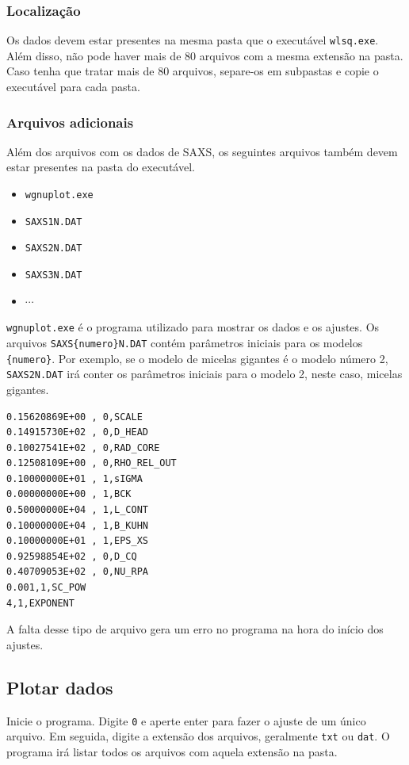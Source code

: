 \begin{apendicesenv}
\subsubsection{Localização}
Os dados devem estar presentes na mesma pasta que o executável \texttt{wlsq.exe}. Além disso, não pode haver mais de 80 arquivos com a mesma extensão na pasta. Caso tenha que tratar mais de 80 arquivos, separe-os em subpastas e copie o executável para cada pasta.

\subsubsection{Arquivos adicionais}
Além dos arquivos com os dados de SAXS, os seguintes arquivos também devem estar presentes na pasta do executável.

\begin{itemize}
	\item \texttt{wgnuplot.exe}
	\item \texttt{SAXS1N.DAT}
	\item \texttt{SAXS2N.DAT}
	\item \texttt{SAXS3N.DAT}
	\item $\cdots$
\end{itemize}

\texttt{wgnuplot.exe} é o programa utilizado para mostrar os dados e os ajustes. Os arquivos \texttt{SAXS\{numero\}N.DAT} contém parâmetros iniciais para os modelos \texttt{\{numero\}}. Por exemplo, se o modelo de micelas gigantes é o modelo número 2, \texttt{SAXS2N.DAT} irá conter os parâmetros iniciais para o modelo 2, neste caso, micelas gigantes.

\begin{verbatim}
0.15620869E+00 , 0,SCALE               
0.14915730E+02 , 0,D_HEAD              
0.10027541E+02 , 0,RAD_CORE            
0.12508109E+00 , 0,RHO_REL_OUT         
0.10000000E+01 , 1,sIGMA               
0.00000000E+00 , 1,BCK                 
0.50000000E+04 , 1,L_CONT              
0.10000000E+04 , 1,B_KUHN              
0.10000000E+01 , 1,EPS_XS              
0.92598854E+02 , 0,D_CQ                
0.40709053E+02 , 0,NU_RPA              
0.001,1,SC_POW
4,1,EXPONENT
\end{verbatim}

A falta desse tipo de arquivo gera um erro no programa na hora do início dos ajustes.

\subsection{Plotar dados}
Inicie o programa. Digite \texttt{0} e aperte enter para fazer o ajuste de um único arquivo. Em seguida, digite a extensão dos arquivos, geralmente \texttt{txt} ou \texttt{dat}. O programa irá listar todos os arquivos com aquela extensão na pasta.


\end{apendicesenv}
